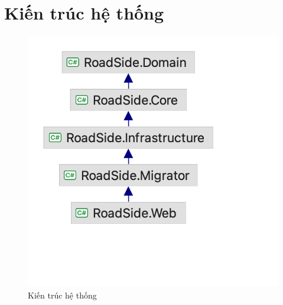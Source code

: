 \section{Kiến trúc hệ thống}
    \begin{figure}[h]
        \centering
        \includegraphics[width=0.6\linewidth]{Images/Roadside.png}
        \caption{Kiến trúc hệ thống}
    \end{figure}


